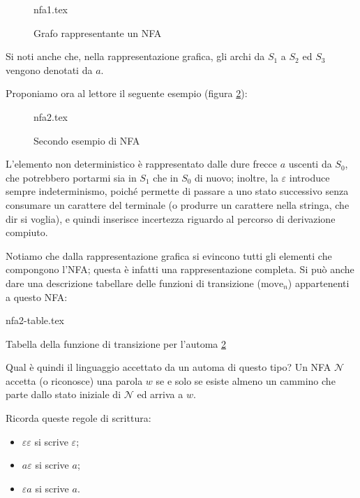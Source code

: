 \documentclass[class=book, crop=false, oneside, 12pt]{standalone}
\begin{document}
\begin{figure}[htb]
	\centering
	{nfa1.tex}
    \caption{Grafo rappresentante un NFA}
	\label{nfa_grafo_esempio}
\end{figure}

\noindent Si noti anche che, nella rappresentazione grafica, gli archi da \(S_1\) a \(S_2\) ed \(S_3\) vengono denotati da \(a\).

Proponiamo ora al lettore il seguente esempio (figura \ref{nfa_grafo_2}):
\begin{figure}[htb]
    \centering
    {nfa2.tex}
    \caption{Secondo esempio di NFA}
    \label{nfa_grafo_2}
\end{figure}
L’elemento non deterministico è rappresentato dalle dure frecce \(a\) uscenti da \(S_0\), che potrebbero portarmi sia in \(S_1\) che in \(S_0\) di nuovo; inoltre, la \(\varepsilon\) introduce sempre indeterminismo, poiché permette di passare a uno stato successivo senza consumare un carattere del terminale (o produrre un carattere nella stringa, che dir si voglia), e quindi inserisce incertezza riguardo al percorso di derivazione compiuto.

Notiamo che dalla rappresentazione grafica si evincono tutti gli elementi che compongono l’NFA; questa è infatti una rappresentazione completa.
Si può anche dare una descrizione tabellare delle funzioni di transizione (\(\textrm{move}_n\)) appartenenti a questo NFA:

\begin{table}[H]
	\centering
	{nfa2-table.tex}
    \caption{Tabella della funzione di transizione per l'automa \ref{nfa_grafo_2}}
    \label{nfa2-table}
\end{table} 

Qual è quindi il linguaggio accettato da un automa di questo tipo?\label{linguaggio_definito_da_un_automa} 
Un NFA \(\mathcal{N}\) accetta (o riconosce) una parola \(w\) se e solo se esiste almeno un cammino che parte dallo stato iniziale di \(\mathcal{N}\) ed arriva a \(w\).

Ricorda queste regole di scrittura:
\begin{itemize}
    \item \(\varepsilon \varepsilon\) si scrive \(\varepsilon\);
    \item \(a\varepsilon\) si scrive \(a\);
    \item \(\varepsilon a\) si scrive \(a\).
\end{itemize}
\end{document}
